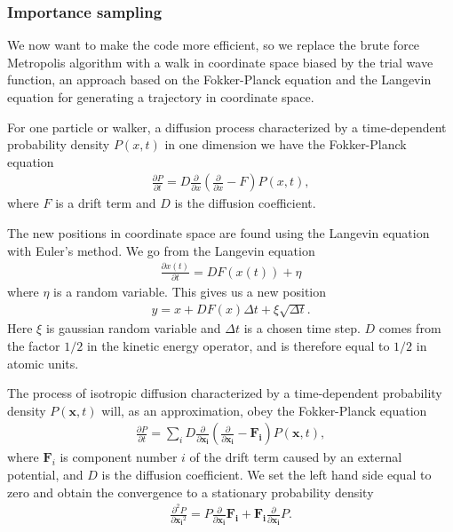 \subsubsection{Importance sampling}
		We now want to make the code more efficient, so we replace the brute
		force Metropolis algorithm with a walk in coordinate space biased
		by the trial wave function, an approach based on the Fokker-Planck
		equation and the Langevin equation for generating a trajectory in
		coordinate space.

		For one particle or walker, a diffusion process characterized by a
		time-dependent probability density $P\left(x,t\right)$ in one dimension
		we have the Fokker-Planck equation
		\begin{align}
			\frac{\partial P}{\partial t}=D\frac{\partial}{\partial x}\left(\frac{\partial}{\partial x}-F\right)P\left(x,t\right),
		\end{align}
		where $F$ is a drift term and $D$ is the diffusion coefficient.

		The new positions in coordinate space are found using the Langevin
		equation with Euler's method. We go from the Langevin equation
		\begin{align}
			\frac{\partial x(t)}{\partial t}=DF(x(t))+\eta
		\end{align}
		where $\eta$ is a random variable. This gives us a new position
		\begin{align}
			y=x+DF(x)\Delta t+\xi\sqrt{\Delta t}.
		\end{align}
		Here $\xi$ is gaussian random variable and $\Delta t$ is a chosen
		time step. $D$ comes from the factor $1/2$ in the kinetic energy
		operator, and is therefore equal to $1/2$ in atomic units.

		The process of isotropic diffusion characterized by a time-dependent
		probability density $P\left(\mathbf{x},t\right)$ will, as an approximation,
		obey the Fokker-Planck equation
		\begin{align}
			\frac{\partial P}{\partial t}=\sum_{i}D\frac{\partial}{\partial\mathbf{x_{i}}}\left(\frac{\partial}{\partial\mathbf{x_{i}}}-\mathbf{F_{i}}\right)P(\mathbf{x},t),
		\end{align}
		where $\mathbf{F}_{i}$ is component number $i$ of the drift term
		caused by an external potential, and $D$ is the diffusion coefficient.
		We set the left hand side equal to zero and obtain the convergence
		to a stationary probability density
		\begin{align}
			\frac{\partial^{2}P}{\partial{\mathbf{x_{i}}^{2}}}=P\frac{\partial}{\partial{\mathbf{x_{i}}}}\mathbf{F_{i}}+\mathbf{F_{i}}\frac{\partial}{\partial{\mathbf{x_{i}}}}P.
		\end{align}


